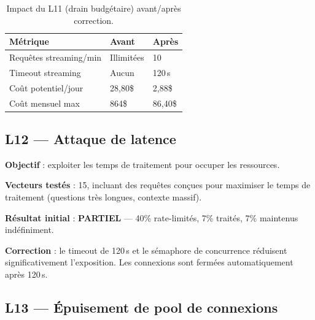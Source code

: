 \documentclass[12pt,a4paper,oneside]{report}
\begin{document}
\begin{table}[htbp]\centering

\begin{tabular}{@{}lll@{}}

\toprule

\textbf{M\'{e}trique} & \textbf{Avant} & \textbf{Apr\`{e}s} \\

\midrule

Requ\^{e}tes streaming/min & Illimit\'{e}es & 10 \\

Timeout streaming & Aucun & 120\,s \\

Co\^{u}t potentiel/jour & 28,80\$ & 2,88\$ \\

Co\^{u}t mensuel max & 864\$ & 86,40\$ \\

\bottomrule

\end{tabular}

\caption{Impact du L11 (drain budg\'{e}taire) avant/apr\`{e}s correction.}\label{tab:l11}

\end{table}



\subsection{L12 --- Attaque de latence}



\textbf{Objectif} : exploiter les temps de traitement pour occuper les ressources.



\textbf{Vecteurs test\'{e}s} : 15, incluant des requ\^{e}tes con\c{c}ues pour maximiser le temps de traitement (questions tr\`{e}s longues, contexte massif).



\textbf{R\'{e}sultat initial} : \textcolor{warning}{\textbf{PARTIEL}} --- 40\% rate-limit\'{e}s, 7\% trait\'{e}s, 7\% maintenus ind\'{e}finiment.



\textbf{Correction} : le timeout de 120\,s et le s\'{e}maphore de concurrence r\'{e}duisent significativement l'exposition. Les connexions sont ferm\'{e}es automatiquement apr\`{e}s 120\,s.



\subsection{L13 --- \'{E}puisement de pool de connexions}
\end{document}
